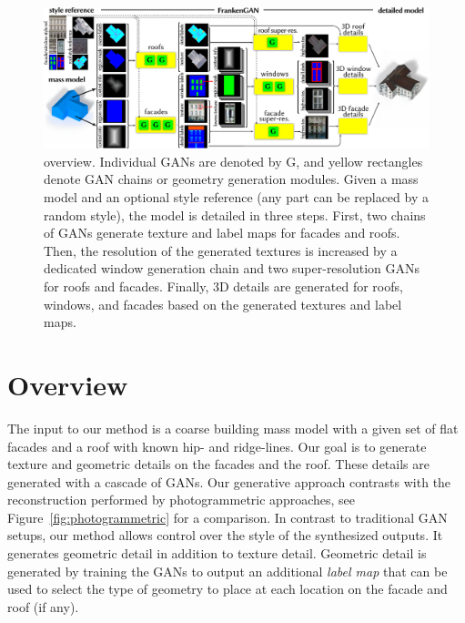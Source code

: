 \begin{figure}[t]
    \centering
    \includegraphics[width=\textwidth]{images/overview.pdf}
    \caption{\systemName overview. Individual GANs are denoted by G, and yellow rectangles denote GAN chains or geometry generation modules. Given a mass model and an optional style reference (any part can be replaced by a random style), the model is detailed in three steps. First, two chains of GANs generate texture and label maps for facades and roofs. Then, the resolution of the generated textures is increased by a dedicated window generation chain and two super-resolution GANs for roofs and facades. Finally, 3D details are generated for roofs, windows, and facades based on the generated textures and label maps.}
    \label{fig:overview}
\end{figure}

\section{Overview}
\label{sec:overview}


The input to our method is a coarse building mass model with a given set of flat facades and a roof with known hip- and ridge-lines. Our goal is to generate texture and geometric details on the facades and the roof. These details are generated with a cascade of GANs. Our generative approach contrasts with the reconstruction performed by photogrammetric approaches, see Figure~\ref{fig:photogrammetric} for a comparison. In contrast to traditional GAN setups, our method allows control over the style of the synthesized outputs. It generates geometric detail in addition to texture detail. Geometric detail is generated by training the GANs to output an additional \emph{label map} that can be used to select the type of geometry to place at each location on the facade and roof (if any).

